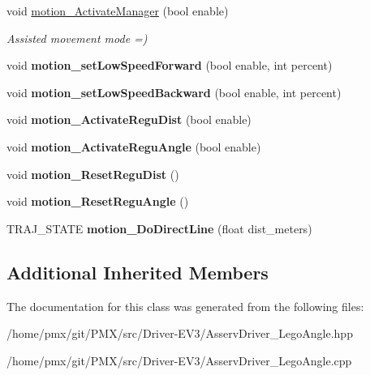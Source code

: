 \begin{DoxyCompactItemize}
\mbox{\label{classAsservDriver__LegoAngle_a082d6c03ecf7b81b8ccac55b1db9eda7}} 
void \hyperlink{classAsservDriver__LegoAngle_a082d6c03ecf7b81b8ccac55b1db9eda7}{motion\+\_\+\+Activate\+Manager} (bool enable)
\begin{DoxyCompactList}\small\item\em Assisted movement mode =) \end{DoxyCompactList}\item 
\mbox{\label{classAsservDriver__LegoAngle_aeb3809ae2718ad327a5874c04e28ae9d}} 
void {\bfseries motion\+\_\+set\+Low\+Speed\+Forward} (bool enable, int percent)
\item 
\mbox{\label{classAsservDriver__LegoAngle_a71eaad73c95e90ca87ec0a14edf54af1}} 
void {\bfseries motion\+\_\+set\+Low\+Speed\+Backward} (bool enable, int percent)
\item 
\mbox{\label{classAsservDriver__LegoAngle_a9bc3497470fcdec7ead0b5931c604b12}} 
void {\bfseries motion\+\_\+\+Activate\+Regu\+Dist} (bool enable)
\item 
\mbox{\label{classAsservDriver__LegoAngle_adb11b50799604d27d3d5ad71fde51dc4}} 
void {\bfseries motion\+\_\+\+Activate\+Regu\+Angle} (bool enable)
\item 
\mbox{\label{classAsservDriver__LegoAngle_aaf20757247281d43a405aacf4fdd226e}} 
void {\bfseries motion\+\_\+\+Reset\+Regu\+Dist} ()
\item 
\mbox{\label{classAsservDriver__LegoAngle_aa8c3b07d19c31db4cab87d23d3f1f646}} 
void {\bfseries motion\+\_\+\+Reset\+Regu\+Angle} ()
\item 
\mbox{\label{classAsservDriver__LegoAngle_a9095a6ed6f88374ffb721889b321e61b}} 
T\+R\+A\+J\+\_\+\+S\+T\+A\+TE {\bfseries motion\+\_\+\+Do\+Direct\+Line} (float dist\+\_\+meters)
\end{DoxyCompactItemize}
\subsection*{Additional Inherited Members}


The documentation for this class was generated from the following files\+:\begin{DoxyCompactItemize}
\item 
/home/pmx/git/\+P\+M\+X/src/\+Driver-\/\+E\+V3/Asserv\+Driver\+\_\+\+Lego\+Angle.\+hpp\item 
/home/pmx/git/\+P\+M\+X/src/\+Driver-\/\+E\+V3/Asserv\+Driver\+\_\+\+Lego\+Angle.\+cpp\end{DoxyCompactItemize}
